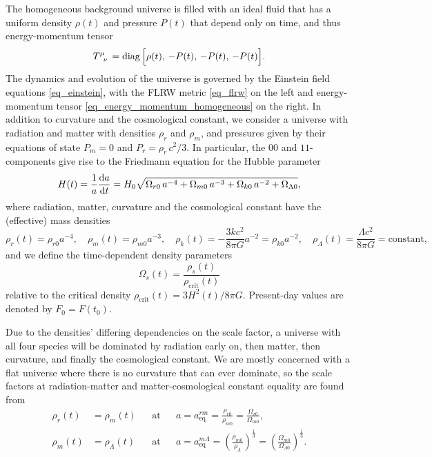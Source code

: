 \documentclass[10pt,a4paper]{article}
\DeclareMathOperator{\diag}{diag}
\begin{document}
The homogeneous background universe is filled with an ideal fluid that has a uniform
density $\rho(t)$ and pressure $P(t)$ that depend only on time, and thus energy-momentum tensor
\begin{equation}
	T\indices{^\mu_\nu} = \diag\Big[\rho(t),\, -P(t),\, -P(t),\, -P(t)\Big].
\label{eq_energy_momentum_homogeneous}
\end{equation}
The dynamics and evolution of the universe is governed by the Einstein field equations \eqref{eq_einstein},
with the FLRW metric \eqref{eq_flrw} on the left and energy-momentum tensor \eqref{eq_energy_momentum_homogeneous} on the right.
In addition to curvature and the cosmological constant,
we consider a universe with radiation and matter with densities $\rho_r$ and $\rho_m$,
and pressures given by their equations of state $P_m = 0$ and $P_r = \rho_r \, c^2 / 3$.
In particular, the $00$ and $11$-components give rise to the Friedmann equation for the Hubble parameter
\begin{equation}
	H(t) = \frac{1}{a} \odv{a}{t} = H_0 \sqrt{\Omega_{r0} \, a^{-4} + \Omega_{m0} \, a^{-3} + \Omega_{k0} \, a^{-2} + \Omega_{\Lambda0}},
\label{eq_friedmann}
\end{equation}
where radiation, matter, curvature and the cosmological constant have the (effective) mass densities
\begin{equation}
	\rho_r(t) = \rho_{r0} a^{-4}, \quad
	\rho_m(t) = \rho_{m0} a^{-3}, \quad
	\rho_k(t) = -\frac{3kc^2}{8 \pi G} a^{-2} = \rho_{k0} a^{-2}, \quad
	\rho_\Lambda(t) = \frac{\Lambda c^2}{8 \pi G} = \text{constant},
\end{equation}
and we define the time-dependent density parameters
\begin{equation}
	\Omega_s(t) = \frac{\rho_s(t)}{\rho_\text{crit}(t)}
\label{eq_density_parameters}
\end{equation}
relative to the critical density $\rho_\text{crit}(t) = 3H^2(t)/8\pi G$.
Present-day values are denoted by $F_0=F(t_0)$.

Due to the densities' differing dependencies on the scale factor,
a universe with all four species will be dominated by radiation early on, then matter, then curvature, and finally the cosmological constant.
We are mostly concerned with a flat universe where there is no curvature that can ever dominate,
so the scale factors at radiation-matter and matter-cosmological constant equality are found from
\begin{subequations}
\begin{align}
	\rho_r(t) &= \rho_m(t)       && \text{at} && a = a_\text{eq}^{rm} = \frac{\rho_{r0}}{\rho_{m0}} = \frac{\Omega_{r0}}{\Omega_{m0}}, \label{eq_equality_radiation_matter} \\
	\rho_m(t) &= \rho_\Lambda(t) && \text{at} && a = a_\text{eq}^{m\Lambda} = \left(\frac{\rho_{m0}}{\rho_{\Lambda}}\right)^\frac13 = \left(\frac{\Omega_{m0}}{\Omega_{\Lambda0}}\right)^\frac13. \label{eq_equality_matter_cosmological_constant}
\end{align}
\label{eq_equality_times}
\end{subequations}
\end{document}
